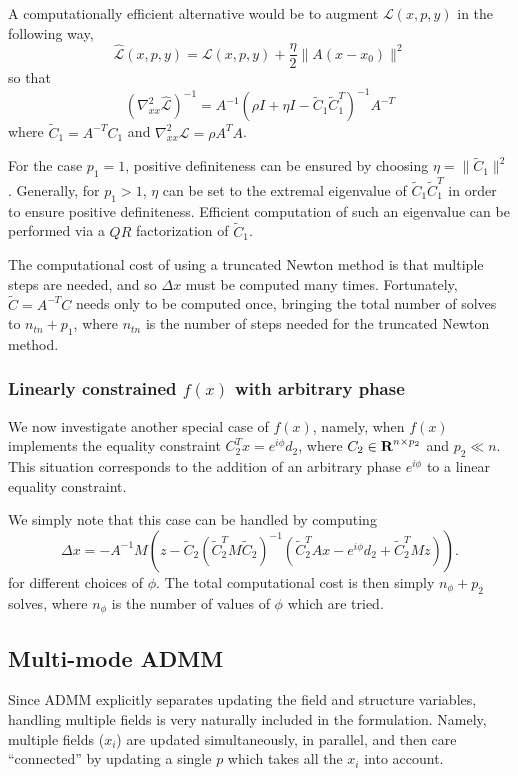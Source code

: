 \documentclass{article}
\newcommand{\tC}{\tilde{C}}
\begin{document}
A computationally efficient alternative would be to augment $\mathcal{L}(x,p,y)$
    in the following way,
    \begin{equation}
    \hat{\mathcal{L}}(x,p,y) = \mathcal{L}(x,p,y) + 
        \frac{\eta}{2} \|A(x - x_0)\|^2
    \end{equation}
    so that
    \begin{equation}
    (\nabla_{xx}^2 \hat{\mathcal{L}})^{-1} = 
        A^{-1} (\rho I + \eta I - \tC_1 \tC_1^T)^{-1} A^{-T}
    \end{equation}
    where $\tC_1 = A^{-T} C_1$ and $\nabla_{xx}^2 \mathcal{L} = \rho A^T A$.

For the case $p_1 = 1$, positive definiteness can be ensured by choosing
    $\eta = \| \tC_1 \|^2$.
Generally, for $p_1 > 1$, $\eta$ can be set to the extremal eigenvalue of
    $\tC_1 \tC_1^T$ in order to ensure positive definiteness.
Efficient computation of such an eigenvalue can be performed
    via a $QR$ factorization of $\tC_1$.

The computational cost of using a truncated Newton method is that 
    multiple steps are needed, and so $\Delta x$ must be computed many times.
Fortunately, $\tC = A^{-T} C$ needs only to be computed once,
    bringing the total number of solves to $n_{tn} + p_1$, 
    where $n_{tn}$ is the number of steps needed 
    for the truncated Newton method.

\subsubsection{Linearly constrained $f(x)$ with arbitrary phase}
We now investigate another special case of $f(x)$, 
    namely, when $f(x)$ implements the equality constraint 
    $C_2^T x = e^{i \phi}d_2$,
    where $C_2 \in {\mbox{\bf R}}^{n \times p_2}$ and $p_2 \ll n$.
This situation corresponds to
    the addition of an arbitrary phase $e^{i\phi}$
    to a linear equality constraint.
    
We simply note that this case can be handled by computing
    \begin{equation}
    \Delta x = -A^{-1} M (z - 
        \tC_2 (\tC_2^T M \tC_2)^{-1}(\tC_2^T Ax - e^{i\phi}d_2 + \tC_2^T Mz)).
    \end{equation}
    for different choices of $\phi$.
The total computational cost is then simply $n_\phi + p_2$ solves,
    where $n_\phi$ is the number of values of $\phi$ which are tried.

\subsection{Multi-mode ADMM}
Since ADMM explicitly separates updating the field and structure variables,
    handling multiple fields is very naturally included in the formulation.
Namely, multiple fields ($x_i$) are updated simultaneously, in parallel,
    and then care ``connected'' by updating a single $p$ 
    which takes all the $x_i$ into account.
\end{document}
